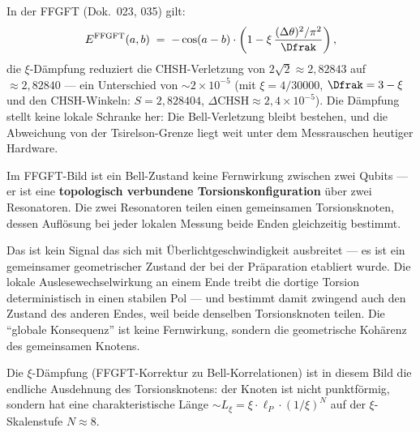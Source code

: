 In der FFGFT (Dok.~023, 035) gilt:
\begin{equation}
  E^{\text{FFGFT}}(a, b) \;=\;
  -\cos(a - b) \cdot
  \left(1 - \xi\,\frac{(\Delta\theta)^2/\pi^2}{\Dfrak}\right),
\end{equation}
die $\xi$-Dämpfung reduziert die CHSH-Verletzung von
$2\sqrt{2} \approx 2{,}82843$ auf
$\approx 2{,}82840$ --- ein Unterschied von
$\sim 2\times10^{-5}$ (mit $\xi = 4/30000$, $\Dfrak = 3 - \xi$ und den CHSH-Winkeln: $S = 2{,}828404$, $\Delta\text{CHSH} \approx 2{,}4\times10^{-5}$).
Die Dämpfung stellt keine lokale Schranke her: Die Bell-Verletzung bleibt bestehen, und die Abweichung von der Tsirelson-Grenze liegt weit unter dem Messrauschen heutiger Hardware.

\begin{foundation}
Im FFGFT-Bild ist ein Bell-Zustand keine
Fernwirkung zwischen zwei Qubits ---
er ist eine \textbf{topologisch verbundene
Torsionskonfiguration} über zwei Resonatoren.
Die zwei Resonatoren teilen einen gemeinsamen
Torsionsknoten, dessen Auflösung
bei jeder lokalen Messung beide Enden
gleichzeitig bestimmt.

Das ist kein Signal das sich mit Überlichtgeschwindigkeit
ausbreitet --- es ist ein gemeinsamer geometrischer
Zustand der bei der Präparation etabliert wurde.
Die lokale Auslesewechselwirkung an einem Ende
treibt die dortige Torsion deterministisch in einen
stabilen Pol --- und bestimmt damit zwingend auch
den Zustand des anderen Endes, weil beide denselben
Torsionsknoten teilen.
Die ``globale Konsequenz'' ist keine Fernwirkung,
sondern die geometrische Kohärenz des gemeinsamen Knotens.

Die $\xi$-Dämpfung (FFGFT-Korrektur zu Bell-Korrelationen)
ist in diesem Bild die endliche Ausdehnung des
Torsionsknotens: der Knoten ist nicht punktförmig,
sondern hat eine charakteristische Länge
$\sim L_\xi = \xi \cdot \ell_P \cdot (1/\xi)^N$
auf der $\xi$-Skalenstufe $N \approx 8$.
\end{foundation}

